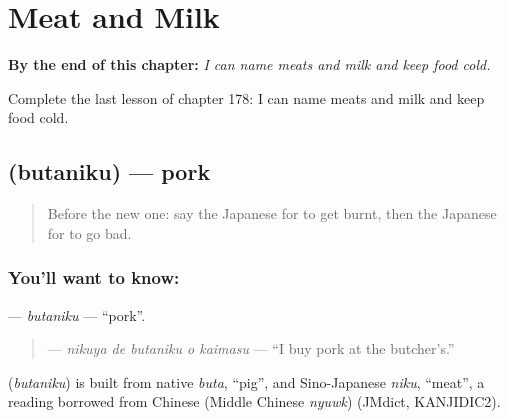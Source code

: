 
\chapter{Meat and Milk}
\label{ch:ja-meat-and-milk}

\begin{chapteropening}
\textbf{By the end of this chapter:} \emph{I can name meats and milk and keep food cold.}

Complete the last lesson of chapter 178: I can name meats and milk and keep food cold.
\end{chapteropening}

\section[\texorpdfstring{\ja{ぶたにく} (butaniku)}{ぶたにく (butaniku)}]{ (butaniku) — pork}

\label{lesson:JA-C178-butaniku}



\begin{quote}
Before the new one: say the Japanese for to get burnt, then the Japanese for to go bad.
\end{quote}

\subsection*{You'll want to know: }
\textbf{} — \emph{butaniku} — \textquotedblleft{}pork\textquotedblright{}.

\begin{quote}
\textbf{  } — \emph{nikuya de butaniku o kaimasu} — \textquotedblleft{}I buy pork at the butcher's.\textquotedblright{}
\end{quote}

\begin{cousinweb}
\textbf{} (\emph{butaniku}) is built from native \emph{buta}, \textquotedblleft{}pig\textquotedblright{}, and Sino-Japanese \emph{niku}, \textquotedblleft{}meat\textquotedblright{}, a reading borrowed from Chinese (Middle Chinese \emph{nyuwk}) (JMdict, KANJIDIC2).
\end{cousinweb}

